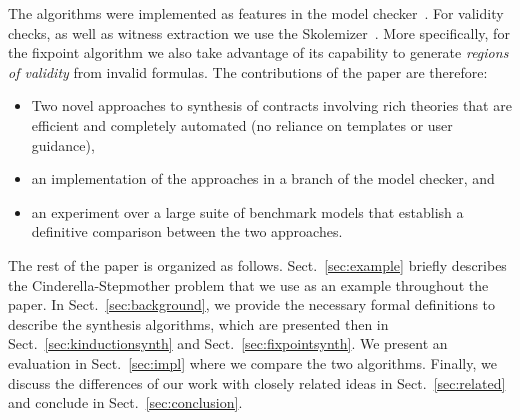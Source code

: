 The algorithms were implemented as features in the \jkind model checker~\cite{gacek2018jk}. For validity checks, as well as witness extraction we use the \aeval Skolemizer~\cite{fedyukovich2015automated}. More specifically, for the fixpoint algorithm we also take advantage of its capability to generate \textit{regions of validity} from invalid formulas.
The contributions of the paper are therefore:
\begin{itemize}
    \item Two novel approaches to synthesis of contracts involving rich theories that are efficient and completely automated (no reliance on templates or user guidance),
    \item an implementation of the approaches in a branch of the \jkind model checker, and
    \item an experiment over a large suite of benchmark models that establish a definitive comparison between the two approaches.
\end{itemize}

The rest of the paper is organized as follows. Sect.~\ref{sec:example} briefly describes the Cinderella-Stepmother problem that we use as an example throughout the paper. In Sect.~\ref{sec:background}, we provide the necessary formal definitions to describe the synthesis algorithms, which are presented then in Sect.~\ref{sec:kinductionsynth} and Sect.~\ref{sec:fixpointsynth}. We present an evaluation in Sect.~\ref{sec:impl} where we compare the two algorithms. Finally, we discuss the differences of our work with closely related ideas in Sect.~\ref{sec:related} and conclude in Sect.~\ref{sec:conclusion}.

